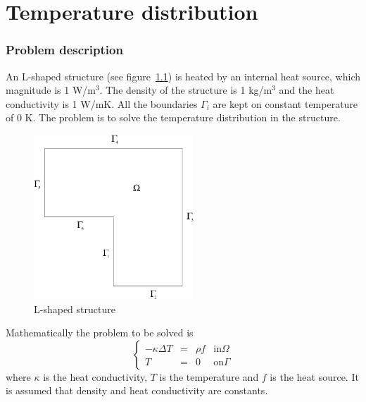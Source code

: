 \chapter{Temperature distribution} %


\subsection*{Problem description}

An L-shaped structure (see figure~\ref{fg:struct1}) is heated by an
internal heat source, which magnitude is 1 W/m$^3$. The density of the
structure is 1 kg/m$^3$ and the heat conductivity is 1 W/mK. All the
boundaries $\Gamma_i$ are kept on constant temperature of 0 K. The
problem is to solve the temperature distribution in the structure.

\begin{figure}
\begin{center}
\includegraphics[width=60mm]{Area1}
\caption{L-shaped structure}\label{fg:struct1}
\end{center}
\end{figure}

Mathematically the problem to be solved is
\begin{equation}
\left \{
\begin{array}{cccc}
- \kappa \Delta T &= &\rho f & \mathrm{ in } \Omega \\
T&=&0 & \mathrm{ on } \Gamma
\end{array}
\right .
\end{equation}
where $\kappa$ is the heat conductivity, $T$  is the temperature 
and $f$ is the heat source. It is assumed that density 
and heat conductivity are constants. 

